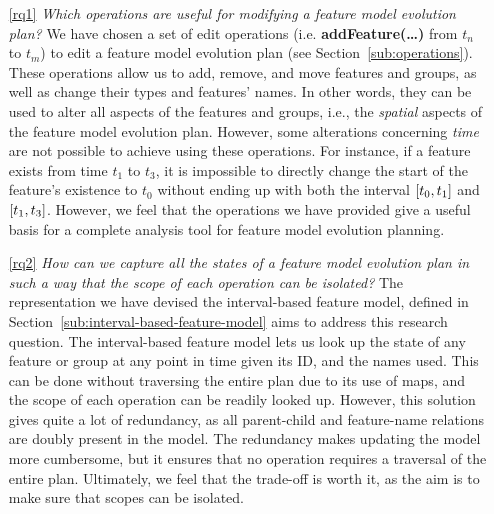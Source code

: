 \begin{enumerate}

   \item[\ref{rq1}] \textit{Which operations are useful for modifying a feature model evolution plan?} 
      We have chosen a set of edit operations (i.e. \textbf{addFeature(\ldots)} from ${t_n}$ to ${t_m}$) to edit a feature model evolution plan (see Section~\vref{sub:operations}). These operations allow us to add, remove, and move features and groups, as well as change their types and features' names. In other words, they can be used to alter all aspects of the features and groups, i.e., the \emph{spatial} aspects of the feature model evolution plan. However, some alterations concerning \emph{time} are not possible to achieve using these operations. For instance, if a feature exists from time $t_1$ to $t_3$, it is impossible to directly change the start of the feature's existence to $t_0$ without ending up with both the interval $\interval{t_0}{t_1}$ and $\interval{t_1}{t_3}$. However, we feel that the operations we have provided give a useful basis for a complete analysis tool for feature model evolution planning. 

   \item[\ref{rq2}]\textit{How can we capture all the states of a feature model evolution plan in such a way that the scope of each operation can be isolated?} 
      The representation we have devised \textemdash{} the interval-based feature model, defined in Section~\vref{sub:interval-based-feature-model} \textemdash{} aims to address this research question. The interval-based feature model lets us look up the state of any feature or group at any point in time given its ID, and the names used. This can be done without traversing the entire plan due to its use of maps, and the scope of each operation can be readily looked up. However, this solution gives quite a lot of redundancy, as all parent-child and feature-name relations are doubly present in the model. The redundancy makes updating the model more cumbersome, but it ensures that no operation requires a traversal of the entire plan. Ultimately, we feel that the trade-off is worth it, as the aim is to make sure that scopes can be isolated.


\end{enumerate}
